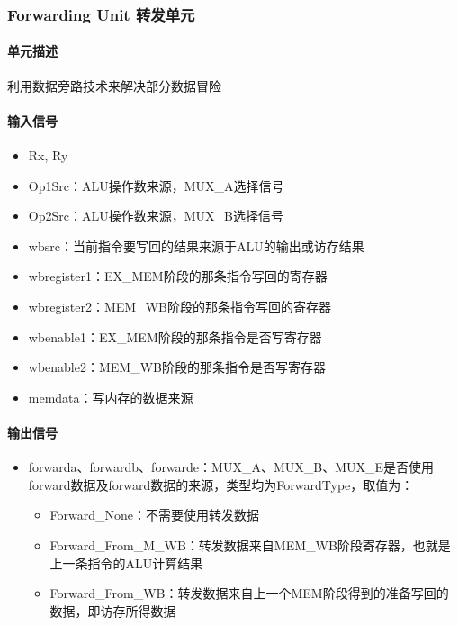 \documentclass{article}
\begin{document}
\subsubsection{Forwarding Unit 转发单元}

\paragraph{单元描述}

利用数据旁路技术来解决部分数据冒险

\paragraph{输入信号}
\begin{itemize}
	\item Rx, Ry
	\item Op1Src：ALU操作数来源，MUX\_A选择信号
	\item Op2Src：ALU操作数来源，MUX\_B选择信号
	\item wbsrc：当前指令要写回的结果来源于ALU的输出或访存结果 
	\item wbregister1：EX\_MEM阶段的那条指令写回的寄存器
	\item wbregister2：MEM\_WB阶段的那条指令写回的寄存器 
	\item wbenable1：EX\_MEM阶段的那条指令是否写寄存器	
	\item wbenable2：MEM\_WB阶段的那条指令是否写寄存器 
	\item memdata：写内存的数据来源
\end{itemize}
\paragraph{输出信号}
\begin{itemize}
	\item forwarda、forwardb、forwarde：MUX\_A、MUX\_B、MUX\_E是否使用forward数据及forward数据的来源，类型均为ForwardType，取值为：
	\begin{itemize}
		\item Forward\_None：不需要使用转发数据
		\item Forward\_From\_M\_WB：转发数据来自MEM\_WB阶段寄存器，也就是上一条指令的ALU计算结果
		\item Forward\_From\_WB：转发数据来自上一个MEM阶段得到的准备写回的数据，即访存所得数据
	\end{itemize}
\end{itemize}
\end{document}
